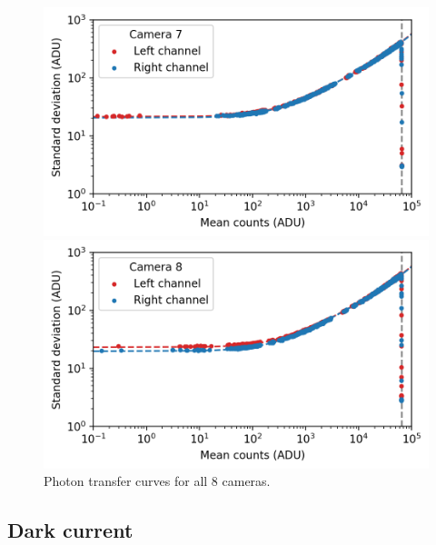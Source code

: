 \begin{colsection}
\begin{colsection}
\begin{figure}[p]
\begin{center}
        \begin{minipage}[t]{0.49\textwidth}\vspace{10pt}
            \includegraphics[width=\linewidth]{images/detectors/ptc_7.png}
        \end{minipage}
        \begin{minipage}[t]{0.49\textwidth}\vspace{10pt}
            \includegraphics[width=\linewidth]{images/detectors/ptc_8.png}
        \end{minipage}
    \end{center}
    \caption[Photon transfer curves for all 8 cameras]{
        Photon transfer curves for all 8 cameras.
        }\label{fig:ptcs}
\end{figure}

\clearpage

\end{colsection}

\newpage
\subsection{Dark current}
\label{sec:dc}
\begin{colsection}


\end{colsection}
\end{colsection}
